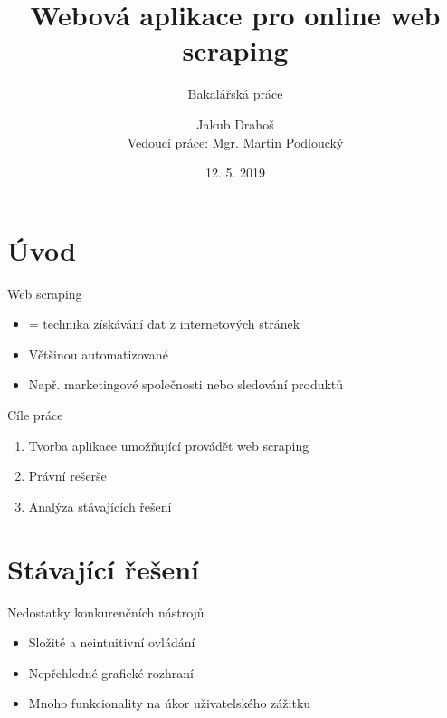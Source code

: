 \documentclass[czech,aspectratio=169]{beamer}
\title[Webová aplikace pro online web scraping]{Webová aplikace pro online web scraping}
\subtitle{Bakalářská práce}
\institute[FIT ČVUT v Praze]{Fakulta informačních technologií \\ České vysoké učení technické v Praze}
\author[J. Drahoš]{Jakub Drahoš \\ Vedoucí práce: Mgr. Martin Podloucký}
\date{12. 5. 2019}
\begin{document}
	\begin{frame}
		\titlepage
	\end{frame}

	\begin{frame}
		\tableofcontents 
	\end{frame}
	
	
	\section{Úvod}
	\begin{frame}{Web scraping}
		\begin{itemize}
			\item = technika získávání dat z internetových stránek
			\item Většinou automatizované
			\item Např. marketingové společnosti nebo sledování produktů
		\end{itemize}
	\end{frame}

	\begin{frame}{Cíle práce}
		\begin{enumerate}
			\item Tvorba aplikace umožňující provádět web scraping
			\item Právní rešerše
			\item Analýza stávajících řešení
		\end{enumerate}
	\end{frame}

	
	\section{Stávající řešení}
	\begin{frame}{Nedostatky konkurenčních nástrojů}
		\begin{itemize}
			\item Složité a neintuitivní ovládání
			\item Nepřehledné grafické rozhraní
			\item Mnoho funkcionality na úkor uživatelského zážitku
		\end{itemize}
	\end{frame}
\end{document}
